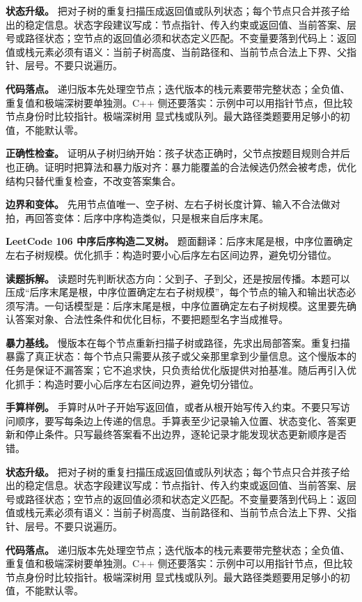 \textbf{状态升级。} 把对子树的重复扫描压成返回值或队列状态；每个节点只合并孩子给出的稳定信息。状态字段建议写成：节点指针、传入约束或返回值、当前答案、层号或路径状态；空节点的返回值必须和状态定义匹配。不变量要落到代码上：返回值或栈元素必须有语义：当前子树高度、当前路径和、当前节点合法上下界、父指针、层号。不要只说遍历。

\textbf{代码落点。} 递归版本先处理空节点；迭代版本的栈元素要带完整状态；全负值、重复值和极端深树要单独测。C++ 侧还要落实：示例中可以用指针节点，但比较节点身份时比较指针。极端深树用  显式栈或队列。最大路径类题要用足够小的初值，不能默认零。

\textbf{正确性检查。} 证明从子树归纳开始：孩子状态正确时，父节点按题目规则合并后也正确。证明时把算法和暴力版对齐：暴力能覆盖的合法候选仍然会被考虑，优化结构只替代重复检查，不改变答案集合。

\textbf{边界和变体。} 先用节点值唯一、空子树、左右子树长度计算、输入不合法做对拍，再回答变体：后序中序构造类似，只是根来自后序末尾。

\noindent\textbf{LeetCode 106 中序后序构造二叉树。} 题面翻译：后序末尾是根，中序位置确定左右子树规模。优化抓手：构造时要小心后序左右区间边界，避免切分错位。

\textbf{读题拆解。} 读题时先判断状态方向：父到子、子到父，还是按层传播。本题可以压成“后序末尾是根，中序位置确定左右子树规模”，每个节点的输入和输出状态必须写清。一句话模型是：后序末尾是根，中序位置确定左右子树规模。这里要先确认答案对象、合法性条件和优化目标，不要把题型名字当成推导。

\textbf{暴力基线。} 慢版本在每个节点重新扫描子树或路径，先求出局部答案。重复扫描暴露了真正状态：每个节点只需要从孩子或父亲那里拿到少量信息。这个慢版本的任务是保证不漏答案；它不追求快，只负责给优化版提供对拍基准。随后再引入优化抓手：构造时要小心后序左右区间边界，避免切分错位。

\textbf{手算样例。} 手算时从叶子开始写返回值，或者从根开始写传入约束。不要只写访问顺序，要写每条边上传递的信息。手算表至少记录输入位置、状态变化、答案更新和停止条件。只写最终答案看不出边界，逐轮记录才能发现状态更新顺序是否错。

\textbf{状态升级。} 把对子树的重复扫描压成返回值或队列状态；每个节点只合并孩子给出的稳定信息。状态字段建议写成：节点指针、传入约束或返回值、当前答案、层号或路径状态；空节点的返回值必须和状态定义匹配。不变量要落到代码上：返回值或栈元素必须有语义：当前子树高度、当前路径和、当前节点合法上下界、父指针、层号。不要只说遍历。

\textbf{代码落点。} 递归版本先处理空节点；迭代版本的栈元素要带完整状态；全负值、重复值和极端深树要单独测。C++ 侧还要落实：示例中可以用指针节点，但比较节点身份时比较指针。极端深树用  显式栈或队列。最大路径类题要用足够小的初值，不能默认零。

